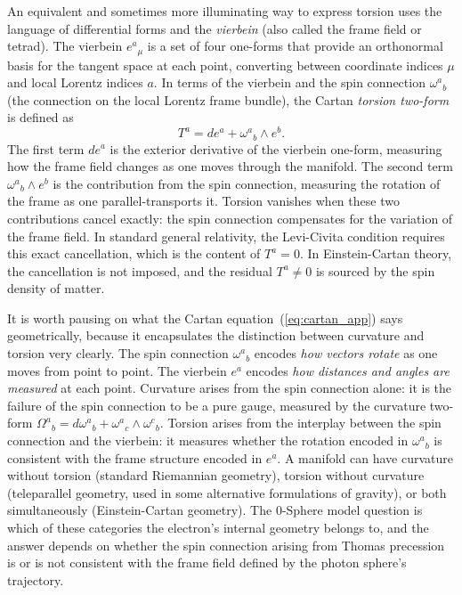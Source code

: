 \documentclass[%
 reprint,
 amsmath,amssymb,
 aps,
 prb,
]{revtex4-2}
\numberwithin{equation}{section}
\begin{document}
An equivalent and sometimes more illuminating way to express torsion uses the language of differential forms and the \emph{vierbein} (also called the frame field or tetrad). The vierbein $e^a{}_\mu$ is a set of four one-forms that provide an orthonormal basis for the tangent space at each point, converting between coordinate indices $\mu$ and local Lorentz indices $a$. In terms of the vierbein and the spin connection $\omega^a{}_b$ (the connection on the local Lorentz frame bundle), the Cartan \emph{torsion two-form} is defined as
\begin{equation}
T^a = de^a + \omega^a{}_b \wedge e^b.
\label{eq:cartan_app}
\end{equation}
The first term $de^a$ is the exterior derivative of the vierbein one-form, measuring how the frame field changes as one moves through the manifold. The second term $\omega^a{}_b \wedge e^b$ is the contribution from the spin connection, measuring the rotation of the frame as one parallel-transports it. Torsion vanishes when these two contributions cancel exactly: the spin connection compensates for the variation of the frame field. In standard general relativity, the Levi-Civita condition requires this exact cancellation, which is the content of $T^a = 0$. In Einstein-Cartan theory, the cancellation is not imposed, and the residual $T^a \neq 0$ is sourced by the spin density of matter.

It is worth pausing on what the Cartan equation~(\ref{eq:cartan_app}) says geometrically, because it encapsulates the distinction between curvature and torsion very clearly. The spin connection $\omega^a{}_b$ encodes \emph{how vectors rotate} as one moves from point to point. The vierbein $e^a$ encodes \emph{how distances and angles are measured} at each point. Curvature arises from the spin connection alone: it is the failure of the spin connection to be a pure gauge, measured by the curvature two-form $\Omega^a{}_b = d\omega^a{}_b + \omega^a{}_c \wedge \omega^c{}_b$. Torsion arises from the interplay between the spin connection and the vierbein: it measures whether the rotation encoded in $\omega^a{}_b$ is consistent with the frame structure encoded in $e^a$. A manifold can have curvature without torsion (standard Riemannian geometry), torsion without curvature (teleparallel geometry, used in some alternative formulations of gravity), or both simultaneously (Einstein-Cartan geometry). The 0-Sphere model question is which of these categories the electron's internal geometry belongs to, and the answer depends on whether the spin connection arising from Thomas precession is or is not consistent with the frame field defined by the photon sphere's trajectory.
\end{document}
